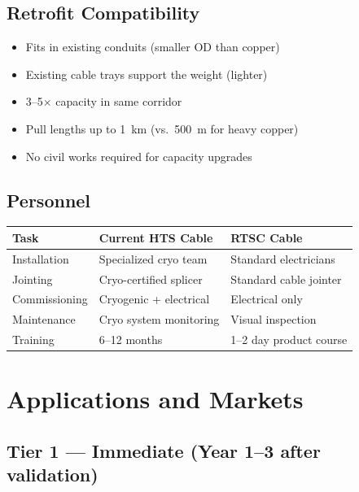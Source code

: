 \documentclass[11pt, a4paper]{article}
\begin{document}
\subsection{Retrofit Compatibility}

\begin{itemize}[nosep]
  \item Fits in existing conduits (smaller OD than copper)
  \item Existing cable trays support the weight (lighter)
  \item 3--5$\times$ capacity in same corridor
  \item Pull lengths up to 1~km (vs.\ 500~m for heavy copper)
  \item No civil works required for capacity upgrades
\end{itemize}

\subsection{Personnel}

\begin{center}
\begin{tabular}{@{}lll@{}}
\toprule
\textbf{Task} & \textbf{Current HTS Cable} & \textbf{RTSC Cable} \\
\midrule
Installation & Specialized cryo team & Standard electricians \\
Jointing & Cryo-certified splicer & Standard cable jointer \\
Commissioning & Cryogenic + electrical & Electrical only \\
Maintenance & Cryo system monitoring & Visual inspection \\
Training & 6--12 months & 1--2 day product course \\
\bottomrule
\end{tabular}
\end{center}

\section{Applications and Markets}
\label{sec:markets}

\subsection{Tier 1 --- Immediate (Year 1--3 after validation)}
\end{document}
